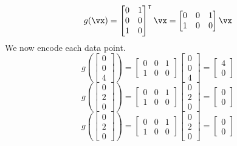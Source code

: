 \begin{enumerate}
    $$g(\vx) = \begin{bmatrix} 0 & 1\\ 0 & 0\\ 1 & 0 \end{bmatrix}^\intercal \vx = \begin{bmatrix} 0 & 0 & 1\\ 1 & 0 & 0 \end{bmatrix} \vx$$
    We now encode each data point.
    $$g\left(\begin{bmatrix} 0\\ 0\\ 4 \end{bmatrix}\right) = \begin{bmatrix} 0 & 0 & 1\\ 1 & 0 & 0 \end{bmatrix} \begin{bmatrix} 0\\ 0\\ 4 \end{bmatrix} = \begin{bmatrix} 4\\ 0 \end{bmatrix}$$
    $$g\left(\begin{bmatrix} 0\\ 2\\ 0 \end{bmatrix}\right) = \begin{bmatrix} 0 & 0 & 1\\ 1 & 0 & 0 \end{bmatrix} \begin{bmatrix} 0\\ 2\\ 0 \end{bmatrix} = \begin{bmatrix} 0\\ 0 \end{bmatrix}$$
    $$g\left(\begin{bmatrix} 0\\ 2\\ 0 \end{bmatrix}\right) = \begin{bmatrix} 0 & 0 & 1\\ 1 & 0 & 0 \end{bmatrix} \begin{bmatrix} 0\\ 2\\ 0 \end{bmatrix} = \begin{bmatrix} 0\\ 0 \end{bmatrix}$$

\end{enumerate}
